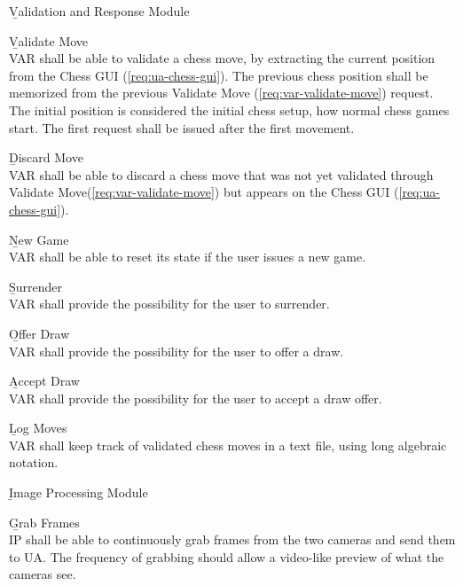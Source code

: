\begin{enumeratenum}
    \item {\b{Validation and Response Module}}
        \begin{enumeratenum}
            \item \b{Validate Move} \label{req:var-validate-move}\\
            VAR shall be able to validate a chess move, by extracting the current position from the Chess GUI (\ref{req:ua-chess-gui}). The previous chess position shall be memorized from the previous Validate Move (\ref{req:var-validate-move}) request. The initial position is considered the initial chess setup, how normal chess games start. The first request shall be issued after the first movement.

            \item \b{Discard Move} \label{req:var-discard-move}\\
            VAR shall be able to discard a chess move that was not yet validated through Validate Move(\ref{req:var-validate-move}) but appears on the Chess GUI (\ref{req:ua-chess-gui}).

            \item \b{New Game} \label{req:var-new-game}\\
            VAR shall be able to reset its state if the user issues a new game.

            \item \b{Surrender} \label{req:var-surrender}\\
            VAR shall provide the possibility for the user to surrender.

            \item \b{Offer Draw} \label{req:var-offer-draw}\\
            VAR shall provide the possibility for the user to offer a draw.

            \item \b{Accept Draw} \label{req:var-accept-draw}\\
            VAR shall provide the possibility for the user to accept a draw offer.

            \item \b{Log Moves} \label{req:var-log-moves}\\
            VAR shall keep track of validated chess moves in a text file, using long algebraic notation.
        \end{enumeratenum}

    \item {\b{Image Processing Module}}
        \begin{enumeratenum}
            \item \b{Grab Frames} \label{req:ip-grab-frames}\\
            IP shall be able to continuously grab frames from the two cameras and send them to UA. The frequency of grabbing should allow a video-like preview of what the cameras see.
            

\end{enumeratenum}
\end{enumeratenum}
